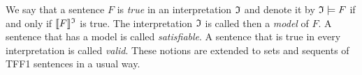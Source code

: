 We say that a sentence $F$ is {\em true} in an interpretation $\mathfrak{I}$
and denote it by $\mathfrak{I} \models F$ if and only if $\llbracket F\rrbracket^{\mathfrak{I}}$ is true.
The interpretation $\mathfrak{I}$ is called then a {\em model\/} of $F$.
A sentence that has a model is called {\em satisfiable}.
A sentence that is true in every interpretation is called {\em valid}.
These notions are extended to sets and sequents of TFF1 sentences in
a usual way.

